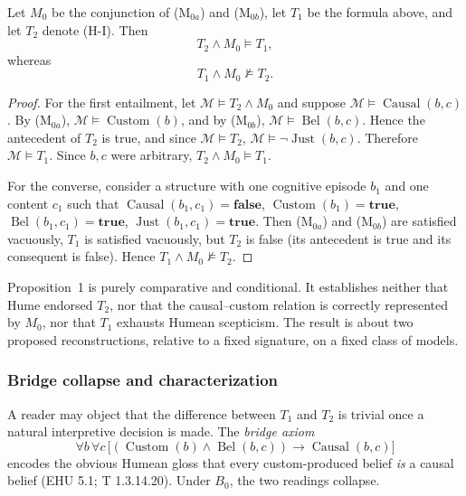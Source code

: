 \begin{proposition}
\label{prop:strength}
Let $M_0$ be the conjunction of (M$_{0a}$) and (M$_{0b}$), let
$T_1$ be the formula above, and let $T_2$ denote (H-I). Then
\[
T_2\land M_0 \models T_1,
\]
whereas
\[
T_1\land M_0 \not\models T_2.
\]
\end{proposition}

\begin{proof}
For the first entailment, let $\mathcal M\models T_2\land M_0$ and
suppose $\mathcal M\models\operatorname{Causal}(b,c)$. By
(M$_{0a}$), $\mathcal M\models\operatorname{Custom}(b)$, and by
(M$_{0b}$), $\mathcal M\models\operatorname{Bel}(b,c)$. Hence the
antecedent of $T_2$ is true, and since $\mathcal M\models T_2$,
$\mathcal M\models\neg\operatorname{Just}(b,c)$. Therefore
$\mathcal M\models T_1$. Since $b,c$ were arbitrary,
$T_2\land M_0\models T_1$.

For the converse, consider a structure with one cognitive episode
$b_1$ and one content $c_1$ such that
$\operatorname{Causal}(b_1,c_1)=\mathbf{false}$,
$\operatorname{Custom}(b_1)=\mathbf{true}$,
$\operatorname{Bel}(b_1,c_1)=\mathbf{true}$,
$\operatorname{Just}(b_1,c_1)=\mathbf{true}$.
Then (M$_{0a}$) and (M$_{0b}$) are satisfied vacuously, $T_1$ is
satisfied vacuously, but $T_2$ is false (its antecedent is true and
its consequent is false). Hence $T_1\land M_0\not\models T_2$.
\end{proof}

Proposition~1 is purely comparative and conditional. It establishes
neither that Hume endorsed $T_2$, nor that the causal--custom relation
is correctly represented by $M_0$, nor that $T_1$ exhausts
Humean scepticism. The result is about two proposed reconstructions,
relative to a fixed signature, on a fixed class of models.

\subsubsection{Bridge collapse and characterization}
\label{sec:bridge-collapse}

A reader may object that the difference between $T_1$ and $T_2$ is
trivial once a natural interpretive decision is made. The
\emph{bridge axiom}
\[
\forall b\,\forall c\,
\bigl[
(\operatorname{Custom}(b)\land\operatorname{Bel}(b,c))
\rightarrow
\operatorname{Causal}(b,c)
\bigr]
\tag{B$_0$}
\]
encodes the obvious Humean gloss that every custom-produced belief
\emph{is} a causal belief (EHU 5.1; T 1.3.14.20). Under $B_0$, the two
readings collapse.

